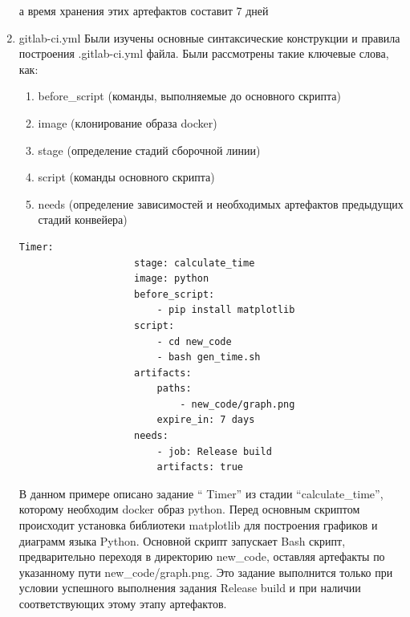 \documentclass[a4paper,14pt]{extreport}
\begin{document}
\begin{enumerate}
			а время хранения этих артефактов составит 7 дней
			\item gitlab-ci.yml
			Были изучены основные синтаксические конструкции и правила 
			построения .gitlab-ci.yml файла. Были рассмотрены такие ключевые 					слова, как:
			\begin{enumerate} 
        				\item before\_script (команды, выполняемые до основного 						скрипта)
				\item image (клонирование образа docker)
				\item stage (определение стадий сборочной линии)
				\item script (команды основного скрипта)
				\item needs (определение зависимостей и необходимых 						артефактов предыдущих стадий конвейера)
			\end{enumerate} 
				\begin{lstlisting}[label=some-code,caption= пример изпользования ключевых слов в .gitlab-ci.yml]
				Timer:
  					stage: calculate_time
					image: python
					before_script:
						- pip install matplotlib
					script:
						- cd new_code
						- bash gen_time.sh
					artifacts:
 						paths:
							- new_code/graph.png
						expire_in: 7 days
					needs:
						- job: Release build
						artifacts: true
				\end{lstlisting}
				В данном примере описано задание “ Timer” из стадии 						“calculate\_time”, которому необходим docker образ python. Перед 						основным скриптом происходит установка библиотеки 							matplotlib для построения графиков и диаграмм языка Python. 					Основной скрипт запускает Bash скрипт, 
				предварительно переходя в директорию new\_code, оставляя 						артефакты по указанному пути new\_code/graph.png. Это 						задание выполнится только при условии успешного 							выполнения задания Release build и при наличии 								соответствующих этому этапу артефактов.
    		\end{enumerate} 
\end{document}
